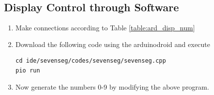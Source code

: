 \subsection{Display Control through Software}
\begin{enumerate}[label=\arabic*.,ref=\theenumi]
\item
Make connections according to Table \ref{table:ard_disp_num}
\begin{table}
\centering

\caption{}
\label{table:ard_disp_num}
\end{table}

\item
Download the following code using the arduinodroid and execute
%
\begin{lstlisting}
cd ide/sevenseg/codes/sevenseg/sevenseg.cpp
pio run
\end{lstlisting}
%
\item
Now generate the numbers 0-9 by modifying the above program.

\end{enumerate}
